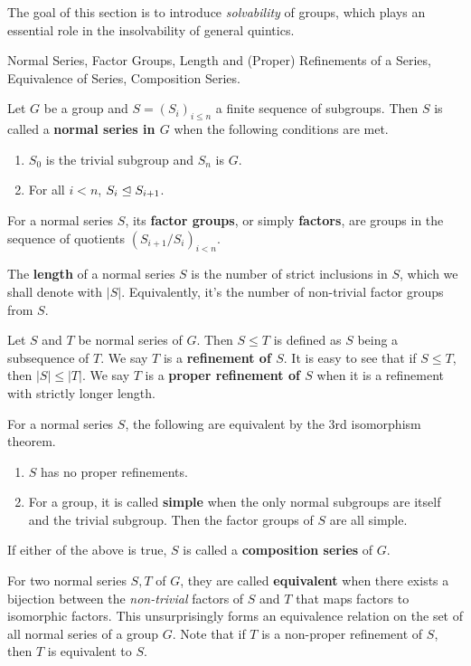 \documentclass[../../book.tex]{subfiles}
\begin{document}
The goal of this section is to introduce \emph{solvability} of groups,
which plays an essential role in the insolvability of general quintics. 
\begin{dfn} Normal Series, Factor Groups, Length 
and (Proper) Refinements of a Series, Equivalence of Series, Composition Series.
    
    Let $G$ be a group and 
    $S = (S_i)_{i\leq n}$ a finite sequence of subgroups.
    Then $S$ is called a \textbf{normal series in $G$} when the following conditions are met.
    \begin{enumerate}
        \item $S_0$ is the trivial subgroup and $S_n$ is $G$. 
        \item For all $i < n$, $S_i \trianglelefteq S_{i+1}$.
    \end{enumerate}
    For a normal series $S$, 
    its \textbf{factor groups}, or simply \textbf{factors},
    are groups in the sequence of quotients $(S_{i+1}/S_i)_{i<n}$.
    
    The \textbf{length} of a normal series $S$ is
    the number of strict inclusions in $S$, which we shall denote with $|S|$.
    Equivalently, it's the number of non-trivial factor groups from $S$. 
    
    Let $S$ and $T$ be normal series of $G$. 
    Then $S \leq T$ is defined as $S$ being a subsequence of $T$. 
    We say $T$ is a \textbf{refinement of $S$}.
    It is easy to see that if $S \leq T$, then $|S| \leq |T|$.
    We say $T$ is a \textbf{proper refinement of $S$}
    when it is a refinement with strictly longer length. 
    
    For a normal series $S$, 
    the following are equivalent by the 3rd isomorphism theorem.
    \begin{enumerate}
        \item $S$ has no proper refinements.
        \item For a group, it is called \textbf{simple} when
        the only normal subgroups are itself and the trivial subgroup.
        Then the factor groups of $S$ are all simple. 
    \end{enumerate}
    If either of the above is true, 
    $S$ is called a \textbf{composition series} of $G$. 
    
    For two normal series $S, T$ of $G$, 
    they are called \textbf{equivalent} when 
    there exists a bijection between the \emph{non-trivial} factors of $S$ and $T$
    that maps factors to isomorphic factors. 
    This unsurprisingly forms an equivalence relation 
    on the set of all normal series of a group $G$. 
    Note that if $T$ is a non-proper refinement of $S$, 
    then $T$ is equivalent to $S$. 
    
\end{dfn}
\end{document}
